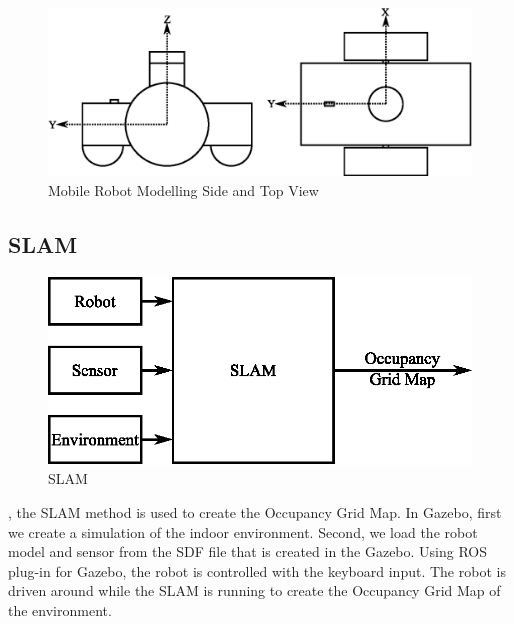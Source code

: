 \begin{figure}[H]
	\centering
	\includegraphics[scale=1]{images/imagess/3method-top-side-view.eps} 
	\caption{Mobile Robot Modelling Side and Top View}
	\label{fig:Mobile Robot Modelling Side and Top View}
\end{figure}





\subsection{SLAM}
\begin{figure}[ht]
	\centering
	\includegraphics[scale=1]{images/imagess/3method-slam.eps} 
	\caption{SLAM}
	\label{fig:SLAM}
\end{figure}
\hspace{1.27cm}
\textbf{\figureautorefname{ \ref{fig:SLAM}}}, the SLAM method is used to create the Occupancy Grid Map. In Gazebo, first we create a simulation of the indoor environment. Second, we load the robot model and sensor from the SDF file that is created in the Gazebo. Using ROS plug-in for Gazebo, the robot is controlled with the keyboard input. The robot is driven around while the SLAM is running to create the Occupancy Grid Map of the environment.\par



